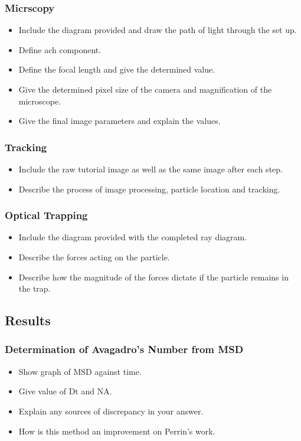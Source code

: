 \documentclass[12pt,a4paper,twoside]{article}
\begin{document}
\subsubsection{Micrscopy}
 \begin{itemize}
	\item Include the diagram provided and draw the path of light through the set up.
	\item Define ach component.
	\item Define the focal length and give the determined value.
	\item Give the determined pixel size of the camera and magnification of the microscope.
	\item Give the final image parameters and explain the values.
\end{itemize}

\subsubsection{Tracking}
 \begin{itemize}
	\item Include the raw tutorial image as well as the same image after each step.
	\item Describe the process of image processing, particle location and tracking.
\end{itemize}

\subsubsection{Optical Trapping}
 \begin{itemize}
	\item Include the diagram provided with the completed ray diagram.
	\item Describe the forces acting on the particle.
	\item Describe how the magnitude of the forces dictate if the particle remains in the trap.
\end{itemize}

\subsection{Results}

\subsubsection{Determination of Avagadro's Number from MSD}
 \begin{itemize}
	\item Show graph of MSD against time.
	\item Give value of Dt and NA.
	\item Explain any sources of discrepancy in your answer.
	\item How is this method an improvement on Perrin's work.
\end{itemize}
\end{document}
